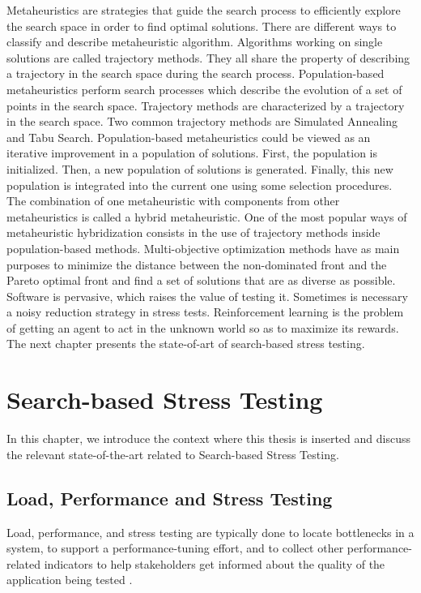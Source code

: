 \documentclass[espaco=umemeio,chapter=TITLE,twoside,openright]{abnt}
\begin{document}
Metaheuristics are strategies that guide the search process to efficiently explore the search space in order to find optimal solutions. There are different ways to classify and describe metaheuristic algorithm. Algorithms working on single solutions are called trajectory methods. They all share the property of describing a trajectory in the search space during the search process. Population-based metaheuristics perform search processes which describe the evolution of a set of points in the search space. Trajectory methods are characterized by a trajectory in the search space. Two common trajectory methods are Simulated Annealing and Tabu Search. Population-based metaheuristics could be viewed as an iterative improvement in a population of solutions. First, the population is initialized. Then, a new population of solutions is generated. Finally, this new population is integrated into the current one using some selection procedures. The combination of one metaheuristic with components from other metaheuristics is called a hybrid metaheuristic. One of the most popular ways of metaheuristic hybridization consists in the use of trajectory methods inside population-based methods. Multi-objective optimization methods have as main purposes to minimize the distance between the non-dominated front and the Pareto optimal front and find a set of solutions that are as diverse as possible. Software is pervasive, which raises the value of testing it. Sometimes is necessary a noisy reduction strategy in stress tests. Reinforcement learning is the problem of getting an agent to act in the unknown world so as to maximize its rewards. The next chapter presents the state-of-art of search-based stress testing.

\chapter{Search-based Stress Testing}

In this chapter, we introduce the context where this thesis is inserted and discuss the relevant state-of-the-art related to Search-based Stress Testing.

\section{Load, Performance and Stress Testing}

Load, performance, and stress testing are typically done to locate bottlenecks in a system, to support a performance-tuning effort, and to collect other performance-related indicators to help stakeholders get informed about the quality of the application being tested \cite{Sandler2004} \cite{Corporation2007}.
\end{document}
